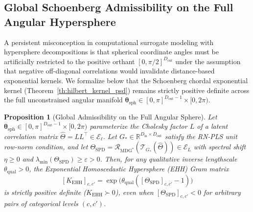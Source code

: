 \documentclass[default,sn-mathphys,Numbered]{sn-jnl}
\theoremstyle{thmstyleone}
\newtheorem{proposition}[theorem]{Proposition}
\theoremstyle{thmstylethree}
\theoremstyle{thmstyletwo}
\newcommand{\inp}{\text{in}}
\newcommand{\outp}{\text{out}}
\begin{document}
\begin{appendices}
\subsection{Global Schoenberg Admissibility on the Full Angular Hypersphere}
\label{subsec:ehh_global_sphere}

A persistent misconception in computational surrogate modeling with hypersphere decompositions \citep{saves2024smt,appriou2024high} is that spherical coordinate angles must be artificially restricted to the positive orthant $[0, \pi/2]^{D_{\outp}}$ under the assumption that negative off-diagonal correlations would invalidate distance-based exponential kernels. We formalize below that the Schoenberg chordal exponential kernel (Theorem~\ref{th:hilbert_kernel_psd}) remains strictly positive definite across the full unconstrained angular manifold $\bm{\theta}_{\mathrm{sph}} \in [0, \pi]^{D_{\outp}-1} \times [0, 2\pi)$.

\begin{proposition}[Global Admissibility on the Full Angular Sphere]
\label{prop:ehh_full_angles}
Let $\bm{\theta}_{\mathrm{sph}} \in [0, \pi]^{D_{\outp}-1} \times [0, 2\pi)$ parameterize the Cholesky factor $L$ of a latent correlation matrix $\hat{\Theta} = L L^\top \in \mathcal{E}_\ell$. Let $G_* \in \mathbb{R}^{D_{\inp} \times D_{\outp}}$ satisfy the RN-PLS unit row-norm condition, and let $\Theta_{\mathrm{SPD}} = \mathcal{R}_{\mathrm{MDG}^*}(\mathcal{T}_{G_*}(\hat{\Theta})) \in \mathcal{E}_L$ with spectral shift $\eta \ge 0$ and $\lambda_{\min}(\Theta_{\mathrm{SPD}}) \ge \varepsilon > 0$.
Then, for any qualitative inverse lengthscale $\theta_{\mathrm{qual}} > 0$, the Exponential Homoscedastic Hypersphere (EHH) Gram matrix
\begin{equation}
\label{eq:ehh_gram_matrix}
[K_{\mathrm{EHH}}]_{c, c'} = \exp\bigl(\theta_{\mathrm{qual}} ([\Theta_{\mathrm{SPD}}]_{c, c'} - 1)\bigr)
\end{equation}
is strictly positive definite ($K_{\mathrm{EHH}} \succ 0$), even when $[\Theta_{\mathrm{SPD}}]_{c, c'} < 0$ for arbitrary pairs of categorical levels $(c, c')$.
\end{proposition}


\end{appendices}
\end{document}
